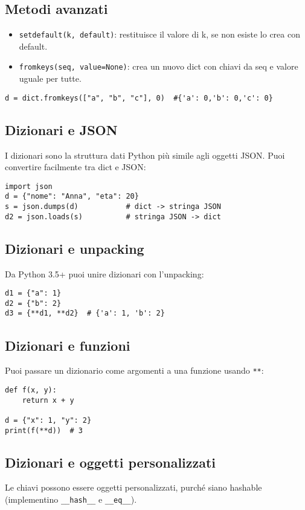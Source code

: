 \documentclass[a4paper,12pt]{article}
\begin{document}
\subsection*{Metodi avanzati}
\begin{itemize}
    \item \texttt{setdefault(k, default)}: restituisce il valore di k, se non esiste lo crea con default.
    \item \texttt{fromkeys(seq, value=None)}: crea un nuovo dict con chiavi da seq e valore uguale per tutte.
\end{itemize}
\begin{lstlisting}
d = dict.fromkeys(["a", "b", "c"], 0)  #{'a': 0,'b': 0,'c': 0}
\end{lstlisting}

\subsection*{Dizionari e JSON}
I dizionari sono la struttura dati Python più simile agli oggetti JSON. Puoi convertire facilmente tra dict e JSON:
\begin{lstlisting}
import json
d = {"nome": "Anna", "eta": 20}
s = json.dumps(d)           # dict -> stringa JSON
d2 = json.loads(s)          # stringa JSON -> dict
\end{lstlisting}

\subsection*{Dizionari e unpacking}
Da Python 3.5+ puoi unire dizionari con l'unpacking:
\begin{lstlisting}
d1 = {"a": 1}
d2 = {"b": 2}
d3 = {**d1, **d2}  # {'a': 1, 'b': 2}
\end{lstlisting}

\subsection*{Dizionari e funzioni}
Puoi passare un dizionario come argomenti a una funzione usando \texttt{**}:
\begin{lstlisting}
def f(x, y):
    return x + y

d = {"x": 1, "y": 2}
print(f(**d))  # 3
\end{lstlisting}

\subsection*{Dizionari e oggetti personalizzati}
Le chiavi possono essere oggetti personalizzati, purché siano hashable (implementino \texttt{\_\_hash\_\_} e \texttt{\_\_eq\_\_}).
\end{document}
